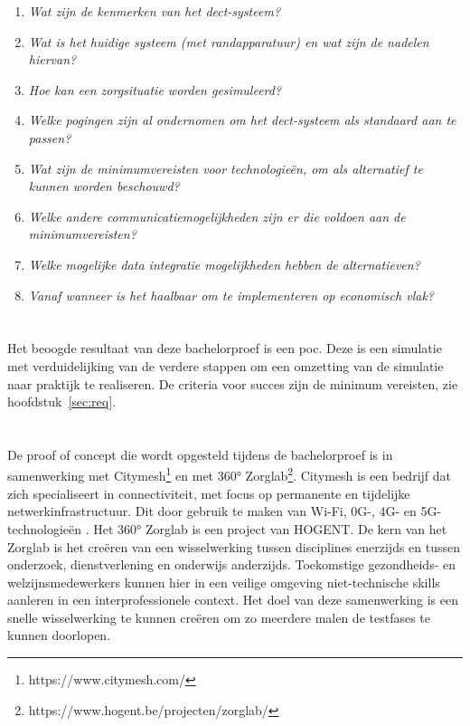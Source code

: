 \begin{enumerate}
  \item \textit{Wat zijn de kenmerken van het \gls{dect}-systeem?}
  \item \textit{Wat is het huidige systeem (met randapparatuur) en wat zijn de nadelen hiervan?}
  \item \textit{Hoe kan een zorgsituatie worden gesimuleerd?}
  \item \textit{Welke pogingen zijn al ondernomen om het \gls{dect}-systeem als standaard aan te passen?}
  \item \textit{Wat zijn de minimumvereisten voor technologieën, om als alternatief te kunnen worden beschouwd?}
  \item \textit{Welke andere communicatiemogelijkheden zijn er die voldoen aan de minimumvereisten?}
  \item \textit{Welke mogelijke data integratie mogelijkheden hebben de alternatieven?}
  \item \textit{Vanaf wanneer is het haalbaar om te implementeren op economisch vlak?}
\end{enumerate}

\section{}%
\label{sec:onderzoeksdoelstelling}


Het beoogde resultaat van deze bachelorproef is een \gls{poc}. Deze is een simulatie met verduidelijking van de verdere stappen om een omzetting van de simulatie naar praktijk te realiseren. De criteria voor succes zijn de minimum vereisten, zie hoofdstuk~\ref{sec:req}.

\section{}%
\label{sec:opzet-bachelorproef}

De proof of concept die wordt opgesteld tijdens de bachelorproef is in samenwerking met Citymesh\footnote{https://www.citymesh.com/} en met 360° Zorglab\footnote{https://www.hogent.be/projecten/zorglab/}. Citymesh is een bedrijf dat zich specialiseert in connectiviteit, met focus op permanente en tijdelijke netwerkinfrastructuur. Dit door gebruik te maken van Wi-Fi, 0G-, 4G- en 5G-technologieën \autocite{Citymesh2024}. Het 360° Zorglab is een project van HOGENT. De kern van het Zorglab is het creëren van een wisselwerking tussen disciplines enerzijds en tussen onderzoek, dienstverlening en onderwijs anderzijds. Toekomstige gezondheids- en welzijnsmedewerkers kunnen hier in een veilige omgeving niet-technische skills aanleren in een interprofessionele context. \autocite{HOGENT2024} Het doel van deze samenwerking is een snelle wisselwerking te kunnen creëren om zo meerdere malen de testfases te kunnen doorlopen. \\

